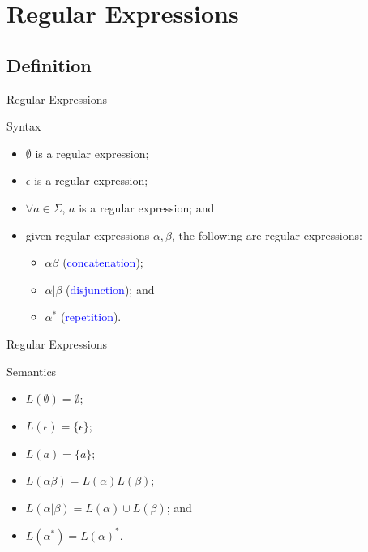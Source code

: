 \documentclass{beamer}
\def\b{\textcolor{blue}}
\begin{document}
\section{Regular Expressions}

\subsection{Definition}

\begin{frame}{Regular Expressions}
    \begin{block}{Syntax}
        \begin{itemize}
            \item $\boldsymbol{\emptyset}$ is a regular expression\pause;
            \item $\epsilon$ is a regular expression\pause;
            \item $\forall a \in \Sigma$, $a$ is a regular expression\pause; and
            \item given regular expressions $\alpha, \beta$, the following are regular expressions:\pause
                \begin{itemize}
                    \item $\alpha \beta$ (\b{concatenation})\pause;
                    \item $\alpha | \beta$ (\b{disjunction})\pause; and
                    \item $\alpha^*$ (\b{repetition}).
                \end{itemize}
        \end{itemize}
    \end{block}
\end{frame}

\begin{frame}{Regular Expressions}
    \begin{block}{Semantics}
        \begin{itemize}
            \item $L(\boldsymbol{\emptyset}) = \emptyset$\pause;
            \item $L(\epsilon) = \{\epsilon\}$\pause;
            \item $L(a) = \{a\}$\pause;
            \item $L(\alpha \beta) = L(\alpha) L(\beta)$\pause;
            \item $L(\alpha | \beta) = L(\alpha) \cup L(\beta)$\pause; and
            \item $L(\alpha^*) = L(\alpha)^*$.
        \end{itemize}
    \end{block}
\end{frame}
\end{document}
